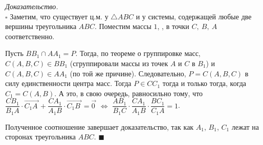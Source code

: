 \documentclass[14pt]{extarticle}
\let\Overrightarrow\overrightarrow
\theoremstyle{definition}
\theoremstyle{theorem}
\renewenvironment{proof}
    {\noindent \textit{Доказательство.}\\
	\indent $\square$}
	{ $\blacksquare$\\ }
\begin{document}
\begin{figure}
	\hspace{-0.3cm}
	\vspace{-2cm}
	\vspace{1cm}
\end{figure}

\begin{proof}
    Заметим, что существует ц.м. у \(\triangle ABC\) и у системы, 
    содержащей любые две вершины треугольника \(ABC\).
	Поместим массы \(1\), 
	,
	в точки $C, \: B, \: A$ соответственно.
    
    Пусть \(BB_1 \cap AA_1 = P\). Тогда, по теореме о группировке масс, 
    \(C(A, B, C) \in BB_1\) (сгруппировали массы из точек \(A\) и \(C\) 
    в \(B_1\)) и \(C(A, B, C) \in AA_1\) (по той же причине). Следовательно, 
    \(P = C(A, B, C)\) в силу единственности центра масс. 
    Тогда \(P \in CC_1\) тогда и только тогда, когда 
    \(C_1 = C(A, B)\). А это, в свою очередь, равносильно тому, что 
    \(\dfrac{CB_1}{B_1A} \cdot \Overrightarrow{C_1A_{\,}} + 
      \dfrac{CA_1}{A_1B} \cdot \Overrightarrow{C_1B_{\:}} = \Overrightarrow{0_{\,}}\)
    \(\iff\)
    \(\dfrac{AB_1}{B_1C} \cdot \dfrac{CA_1}{A_1B} \cdot \dfrac{BC_1}{C_1A} = 1\).
    
    Полученное соотношение завершает доказательство, так как \(A_1\), \(B_1\), 
    \(C_1\) лежат на сторонах треугольника \(ABC\).
\end{proof}
%    
    
\end{document}
